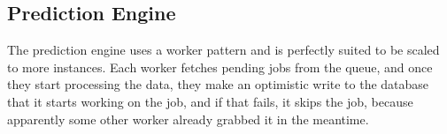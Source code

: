 \subsection{Prediction Engine}
The prediction engine uses a worker pattern and is perfectly suited to be scaled to more instances. Each worker fetches pending jobs from the queue, and once they start processing the data, they make an optimistic write to the database that it starts working on the job, and if that fails, it skips the job, because apparently some other worker already grabbed it in the meantime.
